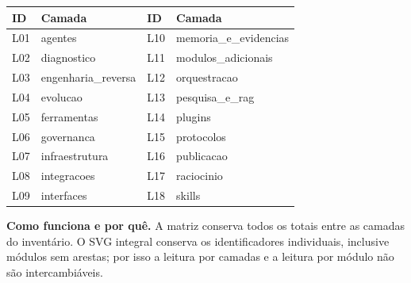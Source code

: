 \begin{center}

\end{center}

{\footnotesize\noindent\begin{tabularx}{\linewidth}{YYYY}\toprule ID & Camada & ID & Camada \\ \midrule

L01 & agentes & L10 & memoria\_e\_evidencias \\

L02 & diagnostico & L11 & modulos\_adicionais \\

L03 & engenharia\_reversa & L12 & orquestracao \\

L04 & evolucao & L13 & pesquisa\_e\_rag \\

L05 & ferramentas & L14 & plugins \\

L06 & governanca & L15 & protocolos \\

L07 & infraestrutura & L16 & publicacao \\

L08 & integracoes & L17 & raciocinio \\

L09 & interfaces & L18 & skills \\

\bottomrule\end{tabularx}}

\noindent\textbf{Como funciona e por quê.} A matriz conserva todos os totais entre as camadas do inventário. O SVG integral conserva os identificadores individuais, inclusive módulos sem arestas; por isso a leitura por camadas e a leitura por módulo não são intercambiáveis.\par


